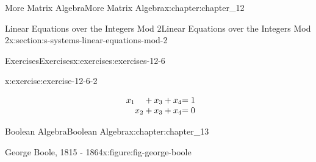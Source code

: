 \documentclass[twoside,10pt,]{book}
\numberwithin{equation}{section}
\begin{document}
\begin{chapterptx}{More Matrix Algebra}{}{More Matrix Algebra}{}{}{x:chapter:chapter_12}
\begin{sectionptx}{Linear Equations over the Integers Mod 2}{}{Linear Equations over the Integers Mod 2}{}{}{x:section:s-systems-linear-equations-mod-2}
\begin{exercises-subsection}{Exercises}{}{Exercises}{}{}{x:exercises:exercises-12-6}
\begin{divisionexercise}{3}{}{}{x:exercise:exercise-12-6-2}
\begin{enumerate}[label=(\alph*)]
\begin{equation*}
\begin{array}{r@{}r@{}r@{}r@{}r@{}r@{}r@{}r@{}r@{}r@{}}
x_1 &       &    & {}+{} &x_3 &{}+{} & x_4 &      &    &= 1 \\
&       & x_2   & {}+{} &x_3 &{}+{} & x_4 &      &    &= 0 \\
\end{array}
\end{equation*}
%
\end{enumerate}
%
\end{divisionexercise}%
\end{exercises-subsection}
\end{sectionptx}
\end{chapterptx}
%
%
\typeout{************************************************}
\typeout{************************************************}
%
\begin{chapterptx}{Boolean Algebra}{}{Boolean Algebra}{}{}{x:chapter:chapter_13}
\begin{introduction}{}%
\begin{figureptx}{George Boole, 1815 - 1864}{x:figure:fig-george-boole}{}%
\begin{image}{0}{1}{0}%

\end{image}
\end{figureptx}
\end{introduction}
\end{chapterptx}
\end{document}
